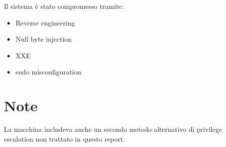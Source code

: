 \documentclass[a4paper,11pt]{article}
\begin{document}
Il sistema è stato compromesso tramite:
\begin{itemize}
    \item Reverse engineering
    \item Null byte injection
    \item XXE
    \item sudo misconfiguration
\end{itemize}

\section{Note}

La macchina includeva anche un secondo metodo alternativo di privilege escalation non trattato in questo report.
\end{document}
